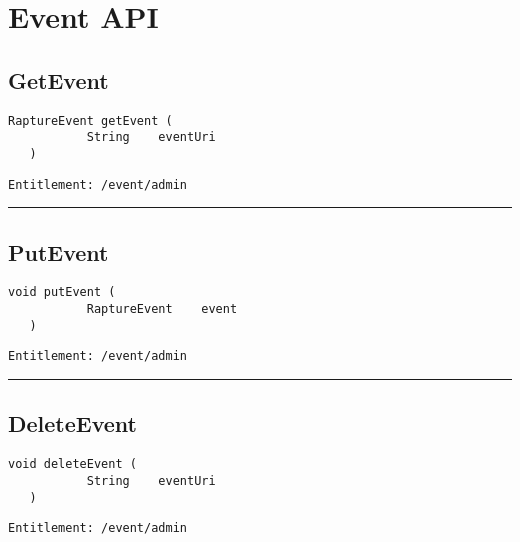 \chapter{Event API}

\section{GetEvent}
\label{Api:GetEvent}
\begin{lstlisting}[style=nonumbers]
   RaptureEvent getEvent (
           String    eventUri
   )
\end{lstlisting}
\begin{Verbatim}[formatcom=\color{Maroon}]
  Entitlement: /event/admin
\end{Verbatim}



\rule{12cm}{2pt}
\section{PutEvent}
\label{Api:PutEvent}
\begin{lstlisting}[style=nonumbers]
   void putEvent (
           RaptureEvent    event
   )
\end{lstlisting}
\begin{Verbatim}[formatcom=\color{Maroon}]
  Entitlement: /event/admin
\end{Verbatim}



\rule{12cm}{2pt}
\section{DeleteEvent}
\label{Api:DeleteEvent}
\begin{lstlisting}[style=nonumbers]
   void deleteEvent (
           String    eventUri
   )
\end{lstlisting}
\begin{Verbatim}[formatcom=\color{Maroon}]
  Entitlement: /event/admin
\end{Verbatim}



